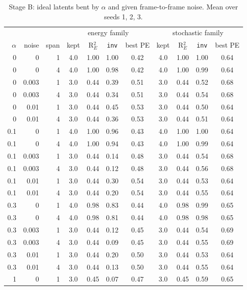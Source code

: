 \begin{table}[t]\centering\small
\caption{Stage B: ideal latents bent by $\alpha$ and given frame-to-frame noise. Mean over seeds 1, 2, 3.}\label{tab:stageB}
\begin{tabular}{rrr|cccc|cccc}\toprule
& & & \multicolumn{4}{c|}{energy family} & \multicolumn{4}{c}{stochastic family}\\
$\alpha$ & noise & span & kept & R$^2_E$ & \texttt{inv} & best PE & kept & R$^2_E$ & \texttt{inv} & best PE\\\midrule
0 & 0 & 1 & 4.0 & 1.00 & 1.00 & 0.42 & 4.0 & 1.00 & 1.00 & 0.64\\
0 & 0 & 4 & 4.0 & 1.00 & 0.98 & 0.42 & 4.0 & 1.00 & 0.99 & 0.64\\
0 & 0.003 & 1 & 3.0 & 0.44 & 0.39 & 0.51 & 3.0 & 0.44 & 0.52 & 0.68\\
0 & 0.003 & 4 & 3.0 & 0.44 & 0.34 & 0.51 & 3.0 & 0.44 & 0.54 & 0.68\\
0 & 0.01 & 1 & 3.0 & 0.44 & 0.45 & 0.53 & 3.0 & 0.44 & 0.50 & 0.64\\
0 & 0.01 & 4 & 3.0 & 0.44 & 0.36 & 0.53 & 3.0 & 0.44 & 0.51 & 0.64\\
0.1 & 0 & 1 & 4.0 & 1.00 & 0.96 & 0.43 & 4.0 & 1.00 & 1.00 & 0.64\\
0.1 & 0 & 4 & 4.0 & 1.00 & 0.94 & 0.43 & 4.0 & 1.00 & 0.99 & 0.64\\
0.1 & 0.003 & 1 & 3.0 & 0.44 & 0.14 & 0.48 & 3.0 & 0.44 & 0.54 & 0.68\\
0.1 & 0.003 & 4 & 3.0 & 0.44 & 0.12 & 0.48 & 3.0 & 0.44 & 0.56 & 0.68\\
0.1 & 0.01 & 1 & 3.0 & 0.44 & 0.30 & 0.54 & 3.0 & 0.44 & 0.53 & 0.64\\
0.1 & 0.01 & 4 & 3.0 & 0.44 & 0.20 & 0.54 & 3.0 & 0.44 & 0.55 & 0.64\\
0.3 & 0 & 1 & 4.0 & 0.98 & 0.83 & 0.44 & 4.0 & 0.98 & 0.99 & 0.65\\
0.3 & 0 & 4 & 4.0 & 0.98 & 0.81 & 0.44 & 4.0 & 0.98 & 0.98 & 0.65\\
0.3 & 0.003 & 1 & 3.0 & 0.44 & 0.12 & 0.45 & 3.0 & 0.44 & 0.54 & 0.69\\
0.3 & 0.003 & 4 & 3.0 & 0.44 & 0.09 & 0.45 & 3.0 & 0.44 & 0.55 & 0.69\\
0.3 & 0.01 & 1 & 3.0 & 0.44 & 0.20 & 0.50 & 3.0 & 0.44 & 0.53 & 0.64\\
0.3 & 0.01 & 4 & 3.0 & 0.44 & 0.13 & 0.50 & 3.0 & 0.44 & 0.55 & 0.64\\
1 & 0 & 1 & 3.0 & 0.45 & 0.07 & 0.47 & 3.0 & 0.45 & 0.59 & 0.65\\

\end{tabular}
\end{table}
